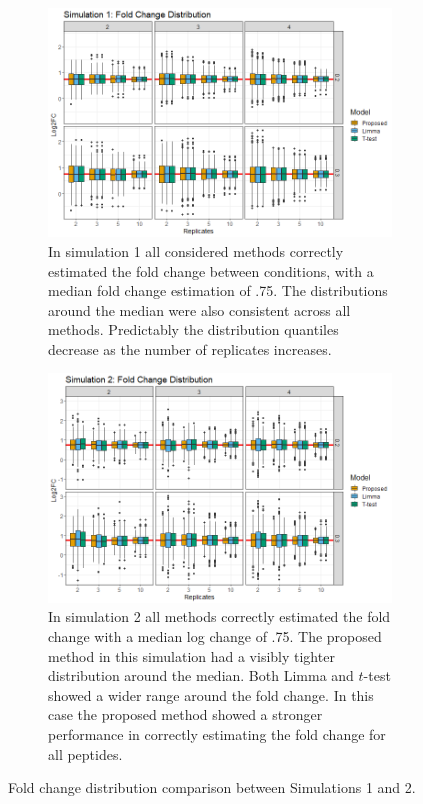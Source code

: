 \documentclass{mcp}
\begin{document}
\begin{figure}[h!]
\centering
 \begin{subfigure}{\textwidth}
 \centering
	\includegraphics[width=.8\textwidth]{sim_new/sim1_FC_boxplot}
	\caption{In simulation 1 all considered methods correctly estimated the fold change between conditions, with a median fold change estimation of .75. The distributions around the median were also consistent across all methods. Predictably the distribution quantiles decrease as the number of replicates increases.}
 \end{subfigure}
 \begin{subfigure}{\textwidth}
  \centering
	\includegraphics[width=.8\textwidth]{sim_new/sim3_FC_boxplot}
	\caption{In simulation 2 all methods correctly estimated the fold change with a median log change of .75. The proposed method in this simulation had a visibly tighter distribution around the median. Both Limma and $t$-test showed a wider range around the fold change. In this case the proposed method showed a stronger performance in correctly estimating the fold change for all peptides.}
 \end{subfigure}
\caption{Fold change distribution comparison between Simulations 1 and 2.}
\label{fig:fc_boxplot}
\end{figure}
\end{document}
